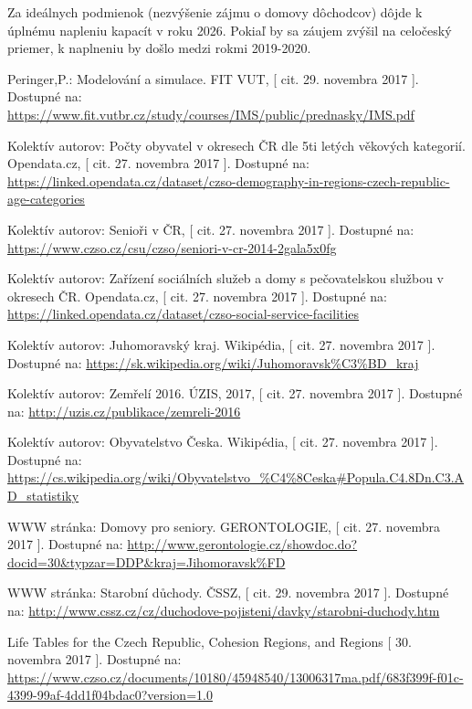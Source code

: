 \documentclass[a4paper, 11pt]{article}
\begin{document}
Za ideálnych podmienok (nezvýšenie zájmu o domovy dôchodcov) dôjde k úplnému napleniu kapacít v roku 2026. Pokiaľ by sa záujem zvýšil na celočeský priemer, k naplneniu by došlo medzi rokmi 2019-2020. 

\newpage
\renewcommand\refname{Zdroje}
\begin{thebibliography}{9}
 Peringer,P.: Modelování a simulace. FIT VUT, [ cit. 29. novembra 2017 ]. Dostupné na: \url{https://www.fit.vutbr.cz/study/courses/IMS/public/prednasky/IMS.pdf}

 Kolektív autorov: Počty obyvatel v okresech ČR dle 5ti letých věkových kategorií. Opendata.cz, [ cit. 27. novembra 2017 ]. Dostupné na: \url{https://linked.opendata.cz/dataset/czso-demography-in-regions-czech-republic-age-categories}

 Kolektív autorov: 	Senioři v ČR, [ cit. 27. novembra 2017 ]. Dostupné na: \url{https://www.czso.cz/csu/czso/seniori-v-cr-2014-2gala5x0fg}

 Kolektív autorov: Zařízení sociálních služeb a domy s pečovatelskou službou v okresech ČR. Opendata.cz, [ cit. 27. novembra 2017 ]. Dostupné na: \url{https://linked.opendata.cz/dataset/czso-social-service-facilities}

 Kolektív autorov: Juhomoravský kraj. Wikipédia, [ cit. 27. novembra 2017 ]. Dostupné na: \url{https://sk.wikipedia.org/wiki/Juhomoravsk%C3%BD_kraj}

 Kolektív autorov: Zemřelí 2016. ÚZIS, 2017, [ cit. 27. novembra 2017 ]. Dostupné na:
\url{http://uzis.cz/publikace/zemreli-2016}

 Kolektív autorov: Obyvatelstvo Česka. Wikipédia, [ cit. 27. novembra 2017 ]. Dostupné na: \url{https://cs.wikipedia.org/wiki/Obyvatelstvo_%C4%8Ceska#Popula.C4.8Dn.C3.AD_statistiky}

 WWW stránka: Domovy pro seniory. GERONTOLOGIE, [ cit. 27. novembra 2017 ]. Dostupné na: 
\url{http://www.gerontologie.cz/showdoc.do?docid=30&typzar=DDP&kraj=Jihomoravsk%FD}

 WWW stránka: Starobní důchody. ČSSZ, [ cit. 29. novembra 2017 ]. Dostupné na: 
\url{http://www.cssz.cz/cz/duchodove-pojisteni/davky/starobni-duchody.htm}

 Life Tables for the Czech Republic, Cohesion Regions, and Regions [ 30. novembra 2017 ]. Dostupné na: \url{https://www.czso.cz/documents/10180/45948540/13006317ma.pdf/683f399f-f01c-4399-99af-4dd1f04bdac0?version=1.0}


\end{thebibliography}
\end{document}
